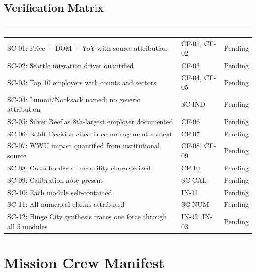 \documentclass[11pt,letterpaper]{article}
\newcommand{\tableheader}[1]{\textbf{\sffamily\textcolor{white}{#1}}}
\begin{document}
\subsection{Verification Matrix}

\begin{center}
\begin{tabularx}{\textwidth}{XL{3.5cm}C{1.5cm}}
\toprule
{}
\tableheader{Success Criterion} & \tableheader{Test ID(s)} & \tableheader{Status} \\
\midrule
SC-01: Price + DOM + YoY with source attribution & CF-01, CF-02 & Pending \\
SC-02: Seattle migration driver quantified & CF-03 & Pending \\
SC-03: Top 10 employers with counts and sectors & CF-04, CF-05 & Pending \\
SC-04: Lummi/Nooksack named; no generic attribution & SC-IND & Pending \\
SC-05: Silver Reef as 8th-largest employer documented & CF-06 & Pending \\
SC-06: Boldt Decision cited in co-management context & CF-07 & Pending \\
SC-07: WWU impact quantified from institutional source & CF-08, CF-09 & Pending \\
SC-08: Cross-border vulnerability characterized & CF-10 & Pending \\
SC-09: Calibration note present & SC-CAL & Pending \\
SC-10: Each module self-contained & IN-01 & Pending \\
SC-11: All numerical claims attributed & SC-NUM & Pending \\
SC-12: Hinge City synthesis traces one force through all 5 modules & IN-02, IN-03 & Pending \\
\bottomrule
\end{tabularx}
\end{center}

\section{Mission Crew Manifest}
\end{document}

